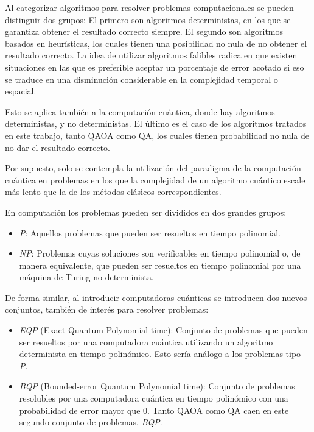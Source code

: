 Al categorizar algoritmos para resolver problemas computacionales se pueden distinguir dos grupos:
El primero son algoritmos deterministas, en los que se garantiza obtener el resultado correcto siempre.
El segundo son algoritmos basados en heurísticas, los cuales tienen una posibilidad no nula de no obtener el resultado correcto.
La idea de utilizar algoritmos falibles radica en que existen situaciones en las que es preferible aceptar un porcentaje de error acotado si eso se traduce en una disminución considerable en la complejidad temporal o espacial.

Esto se aplica también a la computación cuántica, donde hay algoritmos deterministas, y no deterministas.
El último es el caso de los algoritmos tratados en este trabajo, tanto QAOA como QA, los cuales tienen probabilidad no nula de no dar el resultado correcto.

Por supuesto, solo se contempla la utilización del paradigma de la computación cuántica en problemas en los que la complejidad de un algoritmo cuántico escale más lento que la de los métodos clásicos correspondientes.

En computación los problemas pueden ser divididos en dos grandes grupos:

\begin{itemize}
\item \textit{P}: Aquellos problemas que pueden ser resueltos en tiempo polinomial.
\item \textit{NP}: Problemas cuyas soluciones son verificables en tiempo polinomial o, de manera equivalente, que pueden ser resueltos en tiempo polinomial por una máquina de Turing no determinista.
\end{itemize}

De forma similar, al introducir computadoras cuánticas se introducen dos nuevos conjuntos, también de interés para resolver problemas:

\begin{itemize}
\item \textit{EQP} (Exact Quantum Polynomial time):
  Conjunto de problemas que pueden ser resueltos por una computadora cuántica utilizando un algoritmo determinista en tiempo polinómico.
  Esto sería análogo a los problemas tipo \textit{P}.

\item \textit{BQP} (Bounded-error Quantum Polynomial time):
  Conjunto de problemas resolubles por una computadora cuántica en tiempo polinómico con una probabilidad de error mayor que 0.
  Tanto QAOA como QA caen en este segundo conjunto de problemas, \textit{BQP}.
\end{itemize}


